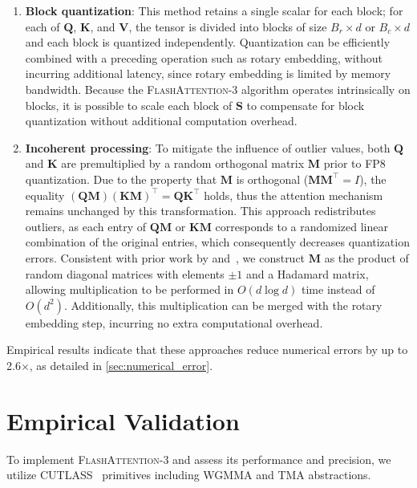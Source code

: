 \begin{enumerate}

\item \textbf{Block quantization}: This method retains a single scalar for each block; for each of $\mathbf{Q}$, $\mathbf{K}$, and $\mathbf{V}$, the tensor is divided into blocks of size $B_r \times d$ or $B_c \times d$ and each block is quantized independently. Quantization can be efficiently combined with a preceding operation such as rotary embedding, without incurring additional latency, since rotary embedding is limited by memory bandwidth. Because the \textsc{FlashAttention-3} algorithm operates intrinsically on blocks, it is possible to scale each block of $\mathbf{S}$ to compensate for block quantization without additional computation overhead.

\item \textbf{Incoherent processing}: To mitigate the influence of outlier values, both $\mathbf{Q}$ and $\mathbf{K}$ are premultiplied by a random orthogonal matrix $\mathbf{M}$ prior to FP8 quantization. Due to the property that $\mathbf{M}$ is orthogonal ($\mathbf{M} \mathbf{M}^\top = I$), the equality $(\mathbf{Q} \mathbf{M}) (\mathbf{K} \mathbf{M})^\top = \mathbf{Q} \mathbf{K}^\top$ holds, thus the attention mechanism remains unchanged by this transformation. This approach redistributes outliers, as each entry of $\mathbf{Q} \mathbf{M}$ or $\mathbf{K} \mathbf{M}$ corresponds to a randomized linear combination of the original entries, which consequently decreases quantization errors. Consistent with prior work by \citet{chee2024quip} and~\citet{tseng2024quip}, we construct $\mathbf{M}$ as the product of random diagonal matrices with elements $\pm 1$ and a Hadamard matrix, allowing multiplication to be performed in $O(d \log d)$ time instead of $O(d^2)$. Additionally, this multiplication can be merged with the rotary embedding step, incurring no extra computational overhead.
\end{enumerate}

Empirical results indicate that these approaches reduce numerical errors by up to 2.6$\times$, as detailed in \cref{sec:numerical_error}.

\section{Empirical Validation}
\label{sec:exp}

To implement \textsc{FlashAttention-3} and assess its performance and precision, we utilize CUTLASS~\citep{Thakkar_CUTLASS_2023} primitives including WGMMA and TMA abstractions.

